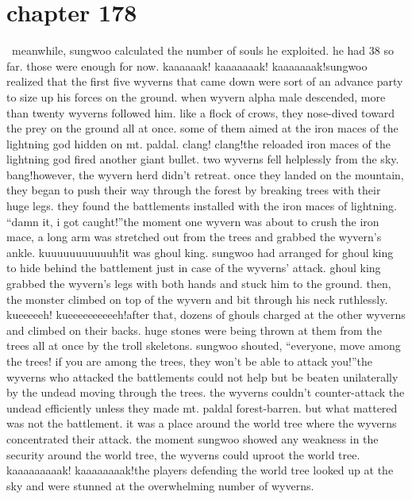 \section{chapter 178}






 meanwhile, sungwoo calculated the number of souls he exploited.
 he had 38 so far.
 those were enough for now.
kaaaaaak! kaaaaaaak! kaaaaaaak!sungwoo realized that the first five wyverns that came down were sort of an advance party to size up his forces on the ground.
 when wyvern alpha male descended, more than twenty wyverns followed him.
 like a flock of crows, they nose-dived toward the prey on the ground all at once.
 some of them aimed at the iron maces of the lightning god hidden on mt.
 paldal.
clang! clang!the reloaded iron maces of the lightning god fired another giant bullet.
 two wyverns fell helplessly from the sky.
bang!however, the wyvern herd didn’t retreat.
 once they landed on the mountain, they began to push their way through the forest by breaking trees with their huge legs.
 they found the battlements installed with the iron maces of lightning.
“damn it, i got caught!”the moment one wyvern was about to crush the iron mace, a long arm was stretched out from the trees and grabbed the wyvern’s ankle.
kuuuuuuuuuuuh!it was ghoul king.
 sungwoo had arranged for ghoul king to hide behind the battlement just in case of the wyverns’ attack.
ghoul king grabbed the wyvern’s legs with both hands and stuck him to the ground.
 then, the monster climbed on top of the wyvern and bit through his neck ruthlessly.
kueeeeeh! kueeeeeeeeeeh!after that, dozens of ghouls charged at the other wyverns and climbed on their backs.
 huge stones were being thrown at them from the trees all at once by the troll skeletons.
sungwoo shouted, “everyone, move among the trees! if you are among the trees, they won’t be able to attack you!”the wyverns who attacked the battlements could not help but be beaten unilaterally by the undead moving through the trees.
 the wyverns couldn’t counter-attack the undead efficiently unless they made mt.
 paldal forest-barren.
but what mattered was not the battlement.
 it was a place around the world tree where the wyverns concentrated their attack.
the moment sungwoo showed any weakness in the security around the world tree, the wyverns could uproot the world tree.
kaaaaaaaaak! kaaaaaaaak!the players defending the world tree looked up at the sky and were stunned at the overwhelming number of wyverns.

